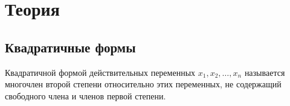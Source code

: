 %
%
%
%
%
%
%

\newpage

\section{Теория}

\subsection{Квадратичные формы}

Квадратичной формой действительных переменных $x_{1}, x_{2}, \ldots, x_{n}$ называется многочлен второй степени относительно этих переменных, не содержащий свободного члена и членов первой степени. \\

